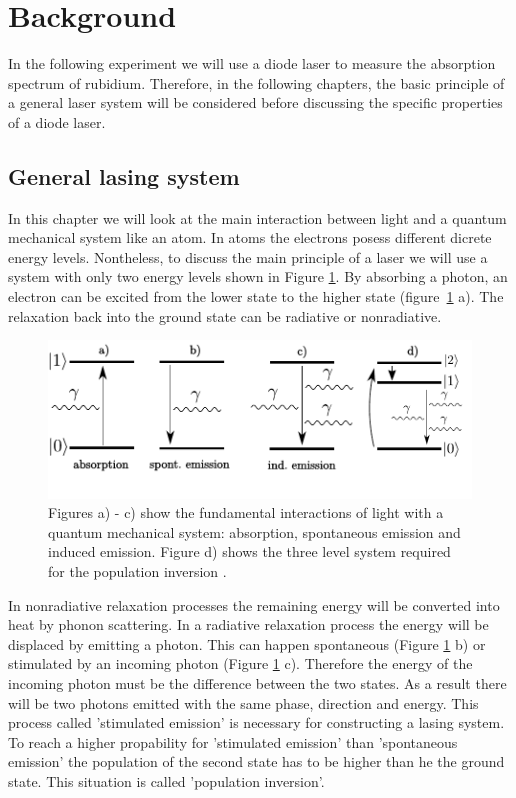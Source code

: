 \section{Background}

In the following experiment we will use a diode laser to measure the absorption
spectrum of rubidium. Therefore, in the following chapters, the basic principle
of a general laser system will be considered before discussing the specific
properties of a diode laser.

\subsection{General lasing system}

In this chapter we will look at the main interaction between light and a
quantum mechanical system like an atom. In atoms the electrons posess different
dicrete energy levels. Nontheless, to discuss the main principle of a laser
we will use a system with only two energy levels shown in Figure \ref{fig:twolevelsystem}.
By absorbing a photon, an electron can be excited from the lower state to the
higher state (figure~\ref{fig:twolevelsystem} a).
The relaxation back into the ground state can be radiative or
nonradiative.
\begin{figure}
  \centering
  \includegraphics[width = \textwidth]{Pics/energyscheme.pdf}
  \caption{Figures a) - c) show the fundamental interactions of light with a
  quantum mechanical system: absorption, spontaneous emission and induced emission.
  Figure d) shows the three level system required for the population inversion
  \cite{steven}.}%
  \label{fig:twolevelsystem}
\end{figure}
In nonradiative relaxation processes the remaining energy will be converted into
heat by phonon scattering. In a radiative relaxation process the energy will
be displaced by emitting a photon. This can happen spontaneous (Figure \ref{fig:twolevelsystem} b)
or stimulated by an incoming photon (Figure \ref{fig:twolevelsystem} c).
Therefore the energy of the incoming photon must be the difference between the
two states. As a result there will be two photons emitted with the same phase,
direction and energy. This process called 'stimulated emission' is necessary
for constructing a lasing system. To reach a higher propability for 'stimulated emission'
than 'spontaneous emission' the population of the second state has to be higher
than he the ground state. This situation is called 'population inversion'.

